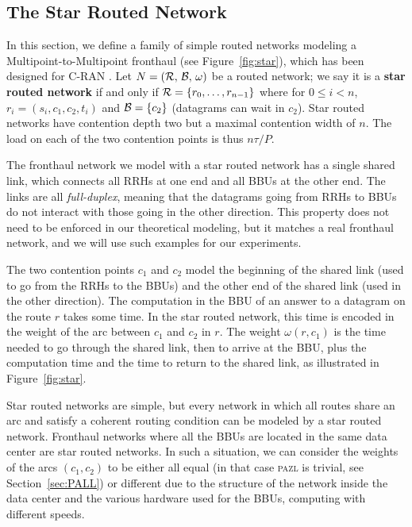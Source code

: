 \documentclass[a4paper,10pt]{journal}
\newcommand\pazl{\textsc{pazl}\xspace}
\begin{document}
\subsection{The Star Routed Network} \label{sec:star_routed_network}

In this section, we define a family of simple routed networks modeling a Multipoint-to-Multipoint fronthaul (see Figure~\ref{fig:star}), which has been designed for C-RAN \cite{tayq2017real}. Let $N = (\cal{R},\,\cal{B},\,\omega)$ be a routed network; we say it is a \textbf{star routed network} if and only if ${\cal R} =\{r_0,\dots,r_{n-1}\}$ where for $0 \leq i<n$, $r_i = (s_i,c_1,c_2,t_i)$ and ${\cal B} = \{ c_2 \}$ (datagrams can wait in $c_2$). Star routed networks have contention depth two but a maximal contention width of $n$. The load on each of the two contention points is thus $n\tau / P$.

The fronthaul network we model with a star routed network has a single shared link, which connects all RRHs at one end and all BBUs at the other end. The links are all \emph{full-duplex}, meaning that the datagrams going from RRHs to BBUs do not interact with those going in the other direction.
This property does not need to be enforced in our theoretical modeling, but it matches a real fronthaul network, and we will use such examples for our experiments.

The two contention points $c_1$ and $c_2$ model the beginning of the shared link (used to go from the RRHs to the BBUs) and the other end of the shared link (used in the other direction).
The computation in the BBU of an answer to a datagram on the route $r$ takes some time.
In the star routed network, this time is encoded in the weight of the arc between $c_1$ and $c_2$ in $r$. The weight $\omega(r,c_1)$ is the time needed to go through the shared link, then to arrive at the BBU, plus the computation time and the time to return to the shared link, as illustrated in Figure~\ref{fig:star}.

Star routed networks are simple, but every network in which all routes share an arc and satisfy a coherent routing condition can be modeled by a star routed network.
Fronthaul networks where all the BBUs are located in the same data center are star routed networks. In such a situation, we can consider the weights of the arcs $(c_1,c_2)$ to be either all equal (in that case \pazl is trivial, see Section~\ref{sec:PALL}) or different due to the structure of the network inside the data center and the various hardware used for the BBUs, computing with different speeds.
\end{document}
